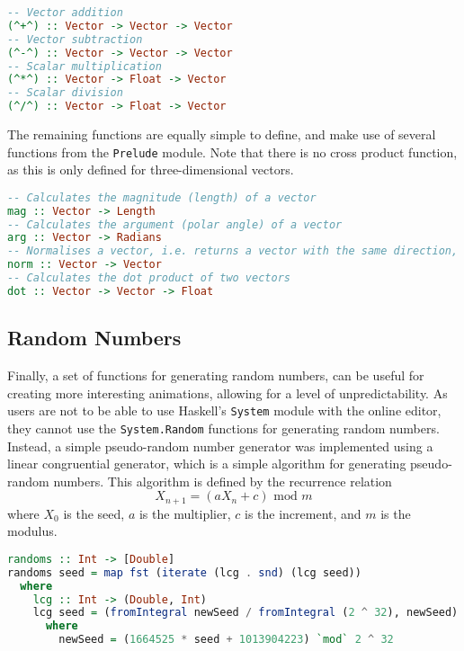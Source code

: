 \documentclass[../main.tex]{subfiles}
\begin{document}
                \begin{lstlisting}[language={Haskell}, label={lst:vectorOps}, caption={The vector 
                    operators.}]
-- Vector addition
(^+^) :: Vector -> Vector -> Vector
-- Vector subtraction
(^-^) :: Vector -> Vector -> Vector
-- Scalar multiplication
(^*^) :: Vector -> Float -> Vector
-- Scalar division
(^/^) :: Vector -> Float -> Vector\end{lstlisting}

                The remaining functions are equally simple to define, and make use of several
                    functions from the \texttt{Prelude} module.
                Note that there is no cross product function, as this is only defined for
                    three-dimensional vectors.

                \begin{lstlisting}[language={Haskell}, label={lst:vectorFns}, caption={The remaining 
                    vector functions.}]
-- Calculates the magnitude (length) of a vector
mag :: Vector -> Length
-- Calculates the argument (polar angle) of a vector
arg :: Vector -> Radians
-- Normalises a vector, i.e. returns a vector with the same direction, but a magnitude of 1
norm :: Vector -> Vector
-- Calculates the dot product of two vectors
dot :: Vector -> Vector -> Float\end{lstlisting}

        \subsection{Random Numbers}
            Finally, a set of functions for generating random numbers, can be useful for
                creating more interesting animations, allowing for a level of unpredictability.
            As users are not to be able to use Haskell's \texttt{System} module with the
                online editor, they cannot use the \texttt{System.Random} functions for
                generating random numbers.
            Instead, a simple pseudo-random number generator was implemented using a linear
                congruential generator, which is a simple algorithm for generating
                pseudo-random numbers.
            This algorithm is defined by the recurrence relation $$X_{n+1} = (aX_n + c)
                    \text{ mod } m$$ where $X_0$ is the seed, $a$ is the multiplier, $c$ is the
                increment, and $m$ is the modulus.

            \begin{lstlisting}[language={Haskell}, label={lst:random}, caption={The random number 
                generator which uses a linear congruential generator to generate  an  infinite list
                of pseudo-random numbers, mapped to the range [0, 1].}]
randoms :: Int -> [Double]
randoms seed = map fst (iterate (lcg . snd) (lcg seed))
  where
    lcg :: Int -> (Double, Int)
    lcg seed = (fromIntegral newSeed / fromIntegral (2 ^ 32), newSeed)
      where
        newSeed = (1664525 * seed + 1013904223) `mod` 2 ^ 32\end{lstlisting}
\end{document}
